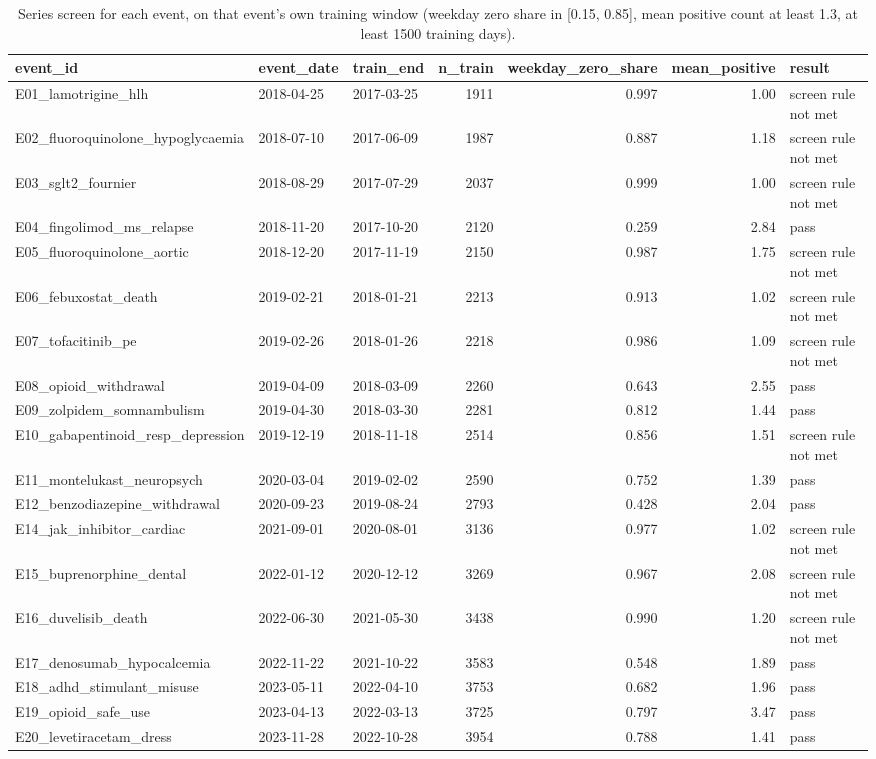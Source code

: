 \begin{table}

\caption{Series screen for each event, on that event's own training window (weekday zero share in [0.15, 0.85], mean positive count at least 1.3, at least 1500 training days).}
\centering
\begin{tabular}[t]{lllrrrl}
\toprule
event\_id & event\_date & train\_end & n\_train & weekday\_zero\_share & mean\_positive & result\\
\midrule
E01\_lamotrigine\_hlh & 2018-04-25 & 2017-03-25 & 1911 & 0.997 & 1.00 & screen rule not met\\
E02\_fluoroquinolone\_hypoglycaemia & 2018-07-10 & 2017-06-09 & 1987 & 0.887 & 1.18 & screen rule not met\\
E03\_sglt2\_fournier & 2018-08-29 & 2017-07-29 & 2037 & 0.999 & 1.00 & screen rule not met\\
E04\_fingolimod\_ms\_relapse & 2018-11-20 & 2017-10-20 & 2120 & 0.259 & 2.84 & pass\\
E05\_fluoroquinolone\_aortic & 2018-12-20 & 2017-11-19 & 2150 & 0.987 & 1.75 & screen rule not met\\
\addlinespace
E06\_febuxostat\_death & 2019-02-21 & 2018-01-21 & 2213 & 0.913 & 1.02 & screen rule not met\\
E07\_tofacitinib\_pe & 2019-02-26 & 2018-01-26 & 2218 & 0.986 & 1.09 & screen rule not met\\
E08\_opioid\_withdrawal & 2019-04-09 & 2018-03-09 & 2260 & 0.643 & 2.55 & pass\\
E09\_zolpidem\_somnambulism & 2019-04-30 & 2018-03-30 & 2281 & 0.812 & 1.44 & pass\\
E10\_gabapentinoid\_resp\_depression & 2019-12-19 & 2018-11-18 & 2514 & 0.856 & 1.51 & screen rule not met\\
\addlinespace
E11\_montelukast\_neuropsych & 2020-03-04 & 2019-02-02 & 2590 & 0.752 & 1.39 & pass\\
E12\_benzodiazepine\_withdrawal & 2020-09-23 & 2019-08-24 & 2793 & 0.428 & 2.04 & pass\\
E14\_jak\_inhibitor\_cardiac & 2021-09-01 & 2020-08-01 & 3136 & 0.977 & 1.02 & screen rule not met\\
E15\_buprenorphine\_dental & 2022-01-12 & 2020-12-12 & 3269 & 0.967 & 2.08 & screen rule not met\\
E16\_duvelisib\_death & 2022-06-30 & 2021-05-30 & 3438 & 0.990 & 1.20 & screen rule not met\\
\addlinespace
E17\_denosumab\_hypocalcemia & 2022-11-22 & 2021-10-22 & 3583 & 0.548 & 1.89 & pass\\
E18\_adhd\_stimulant\_misuse & 2023-05-11 & 2022-04-10 & 3753 & 0.682 & 1.96 & pass\\
E19\_opioid\_safe\_use & 2023-04-13 & 2022-03-13 & 3725 & 0.797 & 3.47 & pass\\
E20\_levetiracetam\_dress & 2023-11-28 & 2022-10-28 & 3954 & 0.788 & 1.41 & pass\\
\bottomrule
\end{tabular}
\end{table}
